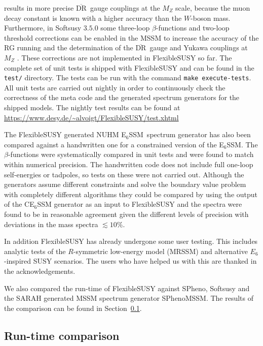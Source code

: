 \documentclass[final,3p,11pt,pdflatex]{elsarticle}
\makeatletter
\newcommand{\fs}{FlexibleSUSY\@\xspace}
\newcommand{\ESSM}{E$_6$SSM\@\xspace}
\newcommand{\code}[1]{\lstinline|#1|}  %
\newcommand{\textoverline}[1]{$\overline{\mbox{#1}}$}
\newcommand{\DRbar}{\textoverline{DR}\xspace}
\newcommand{\secref}[1]{Section~\ref{#1}}
\makeatother
\begin{document}
results in more precise \DRbar\ gauge couplings at the $M_Z$ scale,
because the muon decay constant is known with a higher accuracy than
the $W$-boson mass.  Furthermore, in Softsusy $3.5.0$ some three-loop
$\beta$-functions and two-loop threshold corrections can be enabled in
the MSSM to increase the accuracy of the RG running and the
determination of the \DRbar\ gauge and Yukawa couplings at $M_Z$
\cite{Allanach:2014nba}.  These corrections are not implemented in \fs
so far.  The complete set of unit tests is shipped with \fs and can be
found in the \code{test/} directory.  The tests can be run with the
command \code{make execute-tests}.  All unit tests are carried out
nightly in order to continuously check the correctness of the meta
code and the generated spectrum generators for the shipped models.
The nightly test results can be found at
\url{https://www.desy.de/~alvoigt/FlexibleSUSY/test.xhtml}

The \fs generated NUHM \ESSM\ spectrum generator has also been
compared against a handwritten one for a constrained version of the
\ESSM \cite{Athron:2009ue, Athron:2009bs, Athron:2012pw}.  The
$\beta$-functions were systematically compared in unit tests and were
found to match within numerical precision.  The handwritten code
does not include full one-loop self-energies or tadpoles, so tests on
these were not carried out.  Although the generators assume different
constraints and solve the boundary value problem with completely
different algorithms they could be compared by using the output of
the CE$_6$SSM generator as an input to \fs and the spectra were found
to be in reasonable agreement  given the different levels of precision with deviations in the mass spectra $\lesssim 10\%$.

In addition \fs has already undergone some user testing. This includes
analytic tests of the $R$-symmetric low-energy model (MRSSM) and
alternative $E_6$-inspired SUSY scenarios.  The users who have helped us
with this are thanked in the acknowledgements.

We also compared the run-time of \fs against SPheno, Softsusy and the
SARAH generated MSSM spectrum generator SPhenoMSSM.  The results of
the comparison can be found in \secref{sec:run-time comparison}.

\subsection{Run-time comparison}
\label{sec:run-time comparison}
\end{document}
